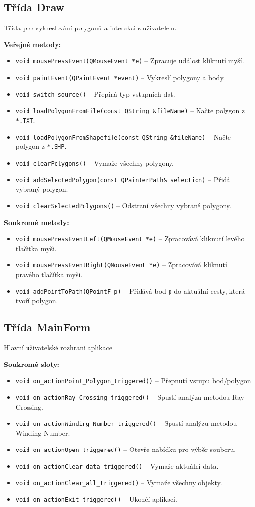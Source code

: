 \subsection{Třída Draw}
Třída pro vykreslování polygonů a interakci s uživatelem.

\textbf{Veřejné metody:}
\begin{itemize}
\item \texttt{void mousePressEvent(QMouseEvent *e)} – Zpracuje událost kliknutí myší.
\item \texttt{void paintEvent(QPaintEvent *event)} – Vykreslí polygony a body.
\item \texttt{void switch\_source()} – Přepíná typ vstupních dat.
\item \texttt{void loadPolygonFromFile(const QString \&fileName)} – Načte polygon z \texttt{*.TXT}.
\item \texttt{void loadPolygonFromShapefile(const QString \&fileName)} – Načte polygon z \texttt{*.SHP}.
\item \texttt{void clearPolygons()} – Vymaže všechny polygony.
\item \texttt{void addSelectedPolygon(const QPainterPath\& selection)} – Přidá vybraný polygon.
\item \texttt{void clearSelectedPolygons()} – Odstraní všechny vybrané polygony.
\end{itemize}

\textbf{Soukromé metody:}
\begin{itemize}
\item \texttt{void mousePressEventLeft(QMouseEvent *e)} – Zpracovává kliknutí levého tlačítka myši.
\item \texttt{void mousePressEventRight(QMouseEvent *e)} – Zpracovává kliknutí pravého tlačítka myši.
\item \texttt{void addPointToPath(QPointF p)} – Přidává bod \texttt{p} do aktuální cesty, která tvoří polygon.
\end{itemize}

\subsection{Třída MainForm}
Hlavní uživatelské rozhraní aplikace.

\textbf{Soukromé sloty:}
\begin{itemize}
\item \texttt{void on\_actionPoint\_Polygon\_triggered()} – Přepnutí vstupu bod/polygon
\item \texttt{void on\_actionRay\_Crossing\_triggered()} – Spustí analýzu metodou Ray Crossing.
\item \texttt{void on\_actionWinding\_Number\_triggered()} – Spustí analýzu metodou Winding Number.
\item \texttt{void on\_actionOpen\_triggered()} – Otevře nabídku pro výběr souboru.
\item \texttt{void on\_actionClear\_data\_triggered()} – Vymaže aktuální data.
\item \texttt{void on\_actionClear\_all\_triggered()} – Vymaže všechny objekty.
\item \texttt{void on\_actionExit\_triggered()} – Ukončí aplikaci.
\end{itemize}
